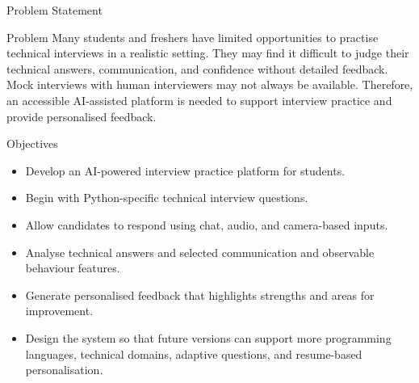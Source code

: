 \documentclass[aspectratio=169,11pt]{beamer}
\begin{document}
\begin{frame}{Problem Statement}
\begin{block}{Problem}
Many students and freshers have limited opportunities to practise technical interviews in a realistic setting. They may find it difficult to judge their technical answers, communication, and confidence without detailed feedback. Mock interviews with human interviewers may not always be available. Therefore, an accessible AI-assisted platform is needed to support interview practice and provide personalised feedback.
\end{block}
\end{frame}

\begin{frame}{Objectives}
\begin{itemize}
  \item Develop an AI-powered interview practice platform for students.
  \item Begin with Python-specific technical interview questions.
  \item Allow candidates to respond using chat, audio, and camera-based inputs.
  \item Analyse technical answers and selected communication and observable behaviour features.
  \item Generate personalised feedback that highlights strengths and areas for improvement.
  \item Design the system so that future versions can support more programming languages, technical domains, adaptive questions, and resume-based personalisation.
\end{itemize}
\end{frame}
\end{document}
